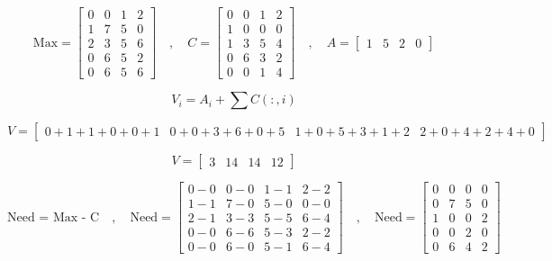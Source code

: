 \vspace{0.5cm}
\[\text{Max} = \left[\begin{matrix} 0 & 0 & 1 & 2 \\
                             1 & 7 & 5 & 0\\
                             2 & 3 & 5 & 6\\
                             0 & 6 & 5 & 2\\
                             0 & 6 & 5 & 6\end{matrix}\right]\quad,\quad
    C = \left[\begin{matrix} 0 & 0 & 1 & 2 \\
                             1 & 0 & 0 & 0\\
                             1 & 3 & 5 & 4\\
                             0 & 6 & 3 & 2\\
                             0 & 0 & 1 & 4\end{matrix}\right]\quad,\quad
            A =\left[\begin{matrix} 1 & 5  & 2 & 0   \end{matrix}\right] 
 \]

\vspace{0.75cm}

 \[V_i = A_i + \sum C(:,i)\]

 \vspace{0.15cm}

\[V =\left[\begin{matrix} 0+1+1+0+0+1 & 0+0+3+6+0+5  & 1+0+5+3+1+2  & 2+0+4+2+4+0 \end{matrix}\right] \]

\vspace{0.15cm}

\[V =\left[\begin{matrix} 3 & 14  & 14  & 12 \end{matrix}\right] \]

\vspace{0.75cm}
 \[ \text{Need = Max - C}\quad,\quad\text{Need} = \left[\begin{matrix} 0-0 & 0-0 & 1-1 & 2-2 \\
                             1-1 & 7-0 & 5-0 & 0-0\\
                             2-1 & 3-3 & 5-5 & 6-4\\
                             0-0 & 6-6 & 5-3 & 2-2\\
                     0-0 & 6-0 & 5-1 & 6-4\end{matrix}\right]\quad,\quad
     \text{Need} = \left[\begin{matrix} 0 & 0 & 0 & 0 \\
                             0 & 7 & 5 & 0\\
                             1 & 0 & 0 & 2\\
                             0 & 0 & 2 & 0\\
                     0 & 6 & 4 & 2\end{matrix}\right]\]

